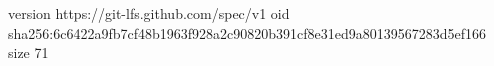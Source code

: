 version https://git-lfs.github.com/spec/v1
oid sha256:6c6422a9fb7cf48b1963f928a2c90820b391cf8e31ed9a80139567283d5ef166
size 71
